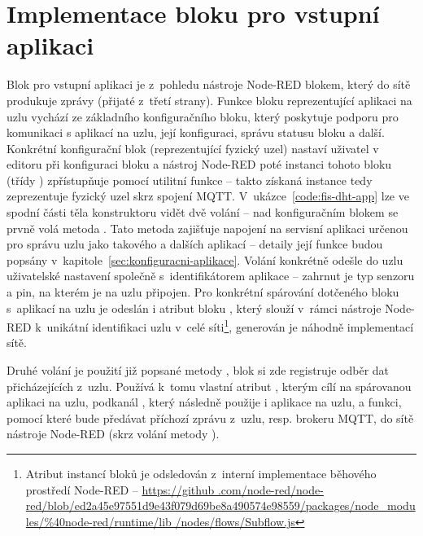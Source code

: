 \section{Implementace bloku pro vstupní aplikaci}\label{sec:implementace-bloku-pro-vstupni-aplikaci}
Blok pro vstupní aplikaci je z~pohledu nástroje Node-RED blokem, který do sítě produkuje zprávy (přijaté z~třetí
strany).
Funkce bloku reprezentující aplikaci na uzlu vychází ze základního konfiguračního bloku, který poskytuje podporu pro
komunikaci s aplikací na uzlu, její konfiguraci, správu statusu bloku a další.
Konkrétní konfigurační blok (reprezentující fyzický uzel) nastaví uživatel v editoru při konfiguraci bloku a nástroj
Node-RED poté instanci tohoto bloku (třídy ) zpřístupňuje pomocí utilitní funkce
\mbox{} -- takto získaná instance tedy zeprezentuje fyzický uzel skrz spojení MQTT.
V~ukázce~\ref{code:fis-dht-app} lze ve spodní části těla konstruktoru vidět dvě volání -- nad konfiguračním blokem se
prvně volá metoda .
Tato metoda zajišťuje napojení na servisní aplikaci určenou pro správu uzlu jako takového a dalších aplikací --
detaily její funkce budou popsány v~kapitole~\ref{sec:konfiguracni-aplikace}.
Volání konkrétně odešle do uzlu uživatelské nastavení společně s~identifikátorem aplikace  -- zahrnut
je typ senzoru a pin, na kterém je na uzlu připojen.
Pro konkrétní spárování dotčeného bloku s~aplikací na uzlu je odeslán i atribut bloku , který slouží
v~rámci nástroje Node-RED k~unikátní identifikaci uzlu v~celé síti\footnote{Atribut  instancí bloků je
odsledován z~interní implementace běhového prostředí Node-RED -- \url{https://github
.com/node-red/node-red/blob/ed2a45e97551d9e43f079d69be8a490574e98559/packages/node_modules/\%40node-red/runtime/lib
/nodes/flows/Subflow.js}}, generován je náhodně implementací sítě.

Druhé volání je použití již popsané metody , blok si zde registruje odběr dat přicházejících
z~uzlu.
Používá k~tomu vlastní atribut , kterým cílí na spárovanou aplikaci na uzlu, podkanál , který
následně použije i aplikace na uzlu, a funkci, pomocí které bude předávat příchozí zprávu z~uzlu, resp. brokeru MQTT,
do sítě nástroje Node-RED (skrz volání metody ).

